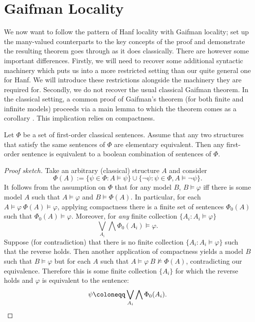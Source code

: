 \documentclass{lmcs} %
\newcommand{\?}{\ensuremath{\mkern0.4\thinmuskip}}
\let\bigland=\bigwedge%
\let\biglor=\bigvee%
\let\phi=\varphi
\begin{document}

\section{Gaifman Locality}\label{sec:Gaif}
We now want to follow the pattern of Hanf locality with Gaifman locality; set up the many-valued counterparts to the key concepts of the proof and demonstrate the resulting theorem goes through as it does classically. There are however some important differences. Firstly, we will need to recover some additional syntactic machinery which puts us into a more restricted setting than our quite general one for Hanf. We will introduce these restrictions alongside the machinery they are required for. Secondly, we do not recover the usual classical Gaifman theorem. In the classical setting, a common proof of Gaifman's theorem (for both finite and infinite models) proceeds via a main lemma to which the theorem comes as a corollary \cite[Theorem 1.5.1]{EbbinghausFlum95:Finmodeltheory}. This implication relies on compactness. 
\begin{propC}
    Let $\Phi$ be a set of first-order classical sentences. Assume that any two structures that satisfy the same sentences of $\Phi$ are elementary equivalent. Then any first-order sentence is equivalent to a boolean combination of sentences of $\Phi$.
\end{propC}
\begin{proof}[Proof sketch]
    Take an arbitrary (classical) structure $A$ and consider \[\Phi(A):=\{\psi\in\Phi:A\models\psi\}\cup\{\neg\psi:\psi\in\Phi, A\models\neg\psi\}.\]
    It follows from the assumption on $\Phi$ that for any model $B$, $B\models\phi$ iff there is some model $A$ such that $A\models\phi$ and $B\models\Phi(A)$. In particular, for each $A\models\phi\ \Phi(A)\models\phi$, applying compactness there is a finite set of sentences $\Phi_0(A)$ such that $\Phi_0(A)\models\phi$. Moreover, for \emph{any} finite collection $\{A_i:A_i\models\phi\}$ \[\biglor\limits_{A_i}\bigland\Phi_0(A_i)\models\phi.\]
    Suppose (for contradiction) that there is no finite collection $\{A_i:A_i\models\phi\}$ such that the reverse holds. Then another application of compactness yields a model $B$ such that $B\models\phi$ but for each $A$ such that $A\models\phi\ B\not\models\Phi(A)$, contradicting our equivalence. Therefore this is some finite collection $\{A_i\}$ for which the reverse holds and $\phi$ is equivalent to the sentence: \[\psi\coloneqq \biglor_{A_i}\bigland\Phi_0(A_i).\qedhere\]
\end{proof}
\end{document}
